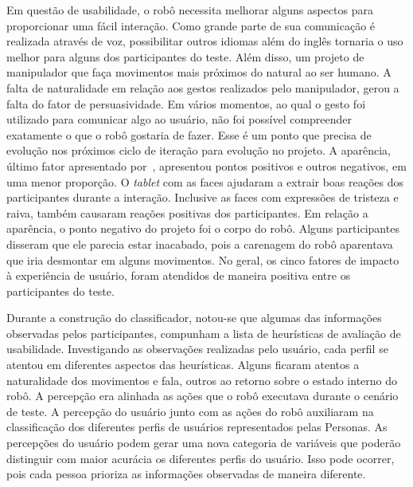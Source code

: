 Em questão de usabilidade, o robô necessita melhorar alguns aspectos para proporcionar uma fácil interação. Como grande parte de sua comunicação é realizada através de voz, possibilitar outros idiomas além do inglês tornaria o uso melhor para alguns dos participantes do teste. Além disso, um projeto de manipulador que faça movimentos mais próximos do natural ao ser humano. A falta de naturalidade em relação aos gestos realizados pelo manipulador, gerou a falta do fator de persuasividade. Em vários momentos, ao qual o gesto foi utilizado para comunicar algo ao usuário, não foi possível compreender exatamente o que o robô gostaria de fazer. Esse é um ponto que precisa de evolução nos próximos ciclo de iteração para evolução no projeto. A aparência, último fator apresentado por~\textcite{hartson:2012}, apresentou pontos positivos e outros negativos, em uma menor proporção. O \emph{tablet} com as faces ajudaram a extrair boas reações dos participantes durante a interação. Inclusive as faces com expressões de tristeza e raiva, também causaram reações positivas dos participantes. Em relação a aparência, o ponto negativo do projeto foi o corpo do robô. Alguns participantes disseram que ele parecia estar inacabado, pois a carenagem do robô aparentava que iria desmontar em alguns movimentos. No geral, os cinco fatores de impacto à experiência de usuário, foram atendidos de maneira positiva entre os participantes do teste.

Durante a construção do classificador, notou-se que algumas das informações observadas pelos participantes, compunham a lista de heurísticas de avaliação de usabilidade. Investigando as observações realizadas pelo usuário, cada perfil se atentou em diferentes aspectos das heurísticas. Alguns ficaram atentos a naturalidade dos movimentos e fala, outros ao retorno sobre o estado interno do robô. A percepção era alinhada as ações que o robô executava durante o cenário de teste. A percepção do usuário junto com as ações do robô auxiliaram na classificação dos diferentes perfis de usuários representados pelas Personas. As percepções do usuário podem gerar uma nova categoria de variáveis que poderão distinguir com maior acurácia os diferentes perfis do usuário. Isso pode ocorrer, pois cada pessoa prioriza as informações observadas de maneira diferente. 
